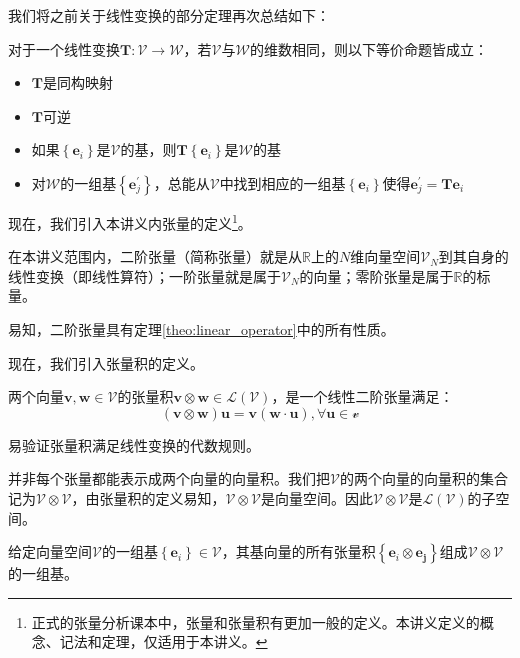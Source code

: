 \documentclass[main.tex]{subfiles}
\begin{document}
我们将之前关于线性变换的部分定理再次总结如下：
\begin{theorem}
对于一个线性变换$\mathbf{T}:\mathcal{V}\rightarrow\mathcal{W}$，若$\mathcal{V}$与$\mathcal{W}$的维数相同，则以下等价命题皆成立：
\begin{itemize}
    \item $\mathbf{T}$是同构映射
    \item $\mathbf{T}$可逆
    \item 如果$\left\{\mathbf{e}_i\right\}$是$\mathcal{V}$的基，则$\mathbf{T}\left\{\mathbf{e}_i\right\}$是$\mathcal{W}$的基
    \item 对$\mathcal{W}$的一组基$\left\{\mathbf{e}^\prime_j\right\}$，总能从$\mathcal{V}$中找到相应的一组基$\left\{\mathbf{e}_i\right\}$使得$\mathbf{e}^\prime_j=\mathbf{T}\mathbf{e}_i$
\end{itemize}
\label{theo:linear_operator}
\end{theorem}

现在，我们引入本讲义内张量的定义\footnote{正式的张量分析课本中，张量和张量积有更加一般的定义。本讲义定义的概念、记法和定理，仅适用于本讲义。}。
\begin{definition}
在本讲义范围内，二阶张量（简称张量）就是从$\mathbb{R}$上的$N$维向量空间$\mathcal{V}_N$到其自身的线性变换（即线性算符）；一阶张量就是属于$\mathcal{V}_N$的向量；零阶张量是属于$\mathbb{R}$的标量。
\end{definition}

易知，二阶张量具有定理\ref{theo:linear_operator}中的所有性质。

现在，我们引入张量积的定义。
\begin{definition}[两个向量的张量积]
两个向量$\mathbf{v},\mathbf{w}\in\mathcal{V}$的张量积$\mathbf{v}\otimes\mathbf{w}\in\mathcal{L}\left(\mathcal{V}\right)$，是一个线性二阶张量满足：
\[\left(\mathbf{v}\otimes\mathbf{w}\right)\mathbf{u}=\mathbf{v}\left(\mathbf{w}\cdot\mathbf{u}\right),\forall\mathbf{u}\in\mathcal{v}\]
\end{definition}

易验证张量积满足线性变换的代数规则。

并非每个张量都能表示成两个向量的向量积。我们把$\mathcal{V}$的两个向量的向量积的集合记为$\mathcal{V}\otimes\mathcal{V}$，由张量积的定义易知，$\mathcal{V}\otimes\mathcal{V}$是向量空间。因此$\mathcal{V}\otimes\mathcal{V}$是$\mathcal{L}\left(\mathcal{V}\right)$的子空间。

\begin{theorem}
给定向量空间$\mathcal{V}$的一组基$\left\{\mathbf{e}_i\right\}\in\mathcal{V}$，其基向量的所有张量积$\left\{\mathbf{e}_i\otimes\mathbf{e_j}\right\}$组成$\mathcal{V}\otimes\mathcal{V}$的一组基。
\end{theorem}
\end{document}
